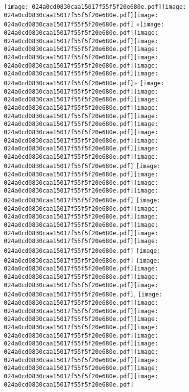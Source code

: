 \documentclass{article}
\newcommand{\origpg}[2]{\texttt{[image: 024a0cd0830caa15017f55f5f20e680e.pdf]}}
\begin{document}
{\vspace{8.576pt}\hspace{18.094pt}\origpg5{103.4pt 471.58pt 115.05pt 487.72pt}\origpg5{114.95pt 471.58pt 123.02pt 487.72pt}\origpg5{123.12pt 471.58pt 131.75pt 487.72pt} «\hspace{-0.361pt}\origpg5{149.17pt 471.58pt 157.22pt 487.72pt}\origpg5{157.12pt 471.58pt 165.19pt 487.72pt}\hspace{-0.113pt}\origpg5{165.08pt 471.58pt 173.3pt 487.72pt}\origpg5{173.3pt 471.58pt 181.37pt 487.72pt}\hspace{-0.145pt}\origpg5{181.22pt 471.58pt 188.84pt 487.72pt}\origpg5{188.92pt 471.58pt 196.99pt 487.72pt}\hspace{-0.355pt}\origpg5{196.64pt 471.58pt 206.85pt 487.72pt}» \origpg5{224.14pt 471.58pt 231.3pt 487.72pt}\origpg5{231.35pt 471.58pt 239.42pt 487.72pt}\hspace{-0.597pt}\origpg5{238.83pt 471.58pt 246.9pt 487.72pt}\hspace{-1.324pt}\origpg5{245.57pt 471.58pt 253.79pt 487.72pt}\origpg5{253.79pt 471.58pt 260.95pt 487.72pt}\origpg5{260.95pt 471.58pt 269.02pt 487.72pt}\hspace{0.145pt}\origpg5{269.17pt 471.58pt 276.34pt 487.72pt}\hspace{-0.178pt}\origpg5{276.16pt 471.58pt 284.79pt 487.72pt}\origpg5{284.79pt 471.58pt 293.43pt 487.72pt}\origpg5{293.49pt 471.58pt 302.13pt 487.72pt} \origpg5{311.85pt 471.58pt 320.06pt 487.72pt}\origpg5{320.06pt 471.58pt 327.68pt 487.72pt}\hspace{-0.42pt}\origpg5{327.26pt 471.58pt 335.33pt 487.72pt}\hspace{-0.355pt}\origpg5{334.97pt 471.58pt 343.04pt 487.72pt} \origpg5{352.55pt 471.58pt 360.67pt 487.72pt}\origpg5{360.72pt 471.58pt 367.88pt 487.72pt}\hspace{-0.178pt}\origpg5{367.71pt 471.58pt 374.87pt 487.72pt}\origpg5{374.92pt 471.58pt 381.97pt 487.72pt}\origpg5{381.91pt 471.58pt 390.55pt 487.72pt}\origpg5{390.55pt 471.58pt 399.18pt 487.72pt} \origpg5{408.64pt 471.58pt 416.26pt 487.72pt} \origpg5{425.73pt 471.58pt 433.8pt 487.72pt}\hspace{-0.355pt}\origpg5{433.45pt 471.58pt 439.82pt 487.72pt}\hspace{-0.113pt}\origpg5{439.71pt 471.58pt 447.76pt 487.72pt}\hspace{0.113pt}\origpg5{447.88pt 471.58pt 455.04pt 487.72pt}\hspace{-0.178pt}, \origpg5{468.72pt 471.58pt 477.36pt 487.72pt}\origpg5{477.36pt 471.58pt 484.52pt 487.72pt}\hspace{-0.145pt}\origpg5{484.38pt 471.58pt 493.01pt 487.72pt}\hspace{-0.21pt}\origpg5{492.8pt 471.58pt 500.87pt 487.72pt}\origpg5{500.97pt 471.58pt 508.14pt 487.72pt}\origpg5{508.18pt 471.58pt 515.8pt 487.72pt}\hspace{-0.145pt}\origpg5{515.66pt 471.58pt 523.71pt 487.72pt}\origpg5{523.61pt 471.58pt 530.78pt 487.72pt}\hspace{-0.178pt}\origpg5{530.6pt 471.58pt 539.24pt 487.72pt}\origpg5{539.24pt 471.58pt 547.87pt 487.72pt}\origpg5{547.94pt 471.58pt 555.1pt 487.72pt} 

}
\end{document}
